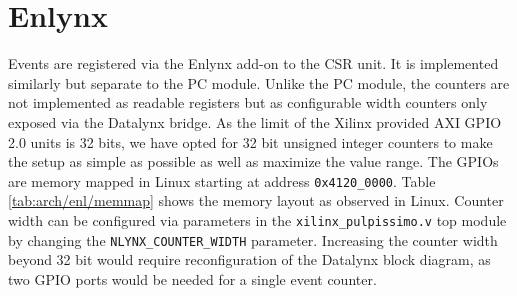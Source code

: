 \documentclass[../bachelor_paper.tex]{subfiles}
\begin{document}
\section{Enlynx}
    \label{sec:arch/enlynx}
Events are registered via the Enlynx add-on to the \ac{CSR} unit. It is implemented similarly but separate to the \ac{PC} module. Unlike the \ac{PC} module, the counters are not implemented as readable registers but as configurable width counters only exposed via the Datalynx bridge. As the limit of the Xilinx provided AXI GPIO 2.0 units is 32 bits, we have opted for 32 bit unsigned integer counters to make the setup as simple as possible as well as maximize the value range. The GPIOs are memory mapped in Linux starting at address \texttt{0x4120\_0000}. Table \ref{tab:arch/enl/memmap} shows the memory layout as observed in Linux. Counter width can be configured via parameters in the \texttt{xilinx\_pulpissimo.v} top module by changing the \texttt{NLYNX\_COUNTER\_WIDTH} parameter. Increasing the counter width beyond 32 bit would require reconfiguration of the Datalynx block diagram, as two GPIO ports would be needed for a single event counter.
\end{document}

